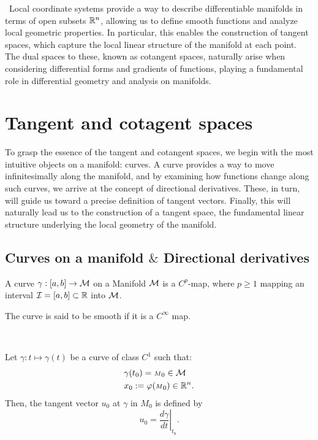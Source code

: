 \,
Local coordinate systems provide a way to describe differentiable manifolds in terms of open subsets $\mathbb{R}^{n}$, allowing us to define smooth functions and analyze local geometric properties. 
In particular, this enables the construction of tangent spaces, which capture the local linear structure of the manifold at each point. The dual spaces to these, known as cotangent spaces, naturally arise when considering differential forms and gradients of functions, playing a fundamental role in differential geometry and analysis on manifolds.
\section{Tangent and cotagent spaces} 
To grasp the essence of the tangent and cotangent spaces, we begin with the most intuitive objects on a manifold: curves. A curve provides a way to move infinitesimally along the manifold, and by examining how functions change along such curves, we arrive at the concept of directional derivatives. These, in turn, will guide us toward a precise definition of tangent vectors. Finally, this will naturally lead us to the construction of a tangent space, the fundamental linear structure underlying the local geometry of the manifold.
\subsection{Curves on a manifold $\&$ Directional derivatives}


\begin{definition}[Curve]
A curve $\gamma:[a,b]\to \mathcal{M}$ on a Manifold $\mathcal{M}$ is a $C^p$-map, where $p\geq 1$ mapping an interval $\mathcal{I}=[a,b]\subset \mathbb{R}$ into $\mathcal{M}$. 
\end{definition}

The curve is said to be smooth if it is a $C^\infty$ map.

\, 
\begin{definition}
Let $\gamma:t\mapsto \gamma(t)$ be a curve of class $C^1$ such that:
\begin{align*}
    &\gamma(t_0)={\scriptstyle M}_0 \in \mathcal{M}\\
    &x_0:=\varphi({\scriptstyle M}_0) \in\mathbb{R}^n.
\end{align*}
Then, the tangent vector $u_0$ at $\gamma$ in ${\scriptstyle M}_0$ is defined by
\begin{equation}
u_0 =\left. \frac{d \gamma}{dt}\right|_{t_0}.
\end{equation}
 \end{definition}

